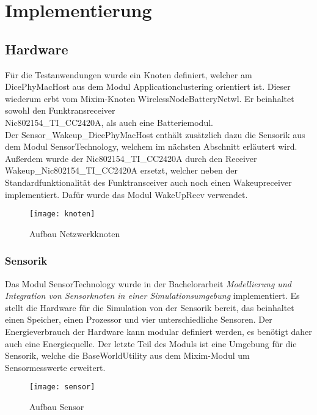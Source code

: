 \chapter{Implementierung}

\section{Hardware}

Für die Testanwendungen wurde ein Knoten definiert, welcher am DicePhyMacHost aus dem Modul Applicationclustering orientiert ist. Dieser wiederum erbt vom Mixim-Knoten WirelessNodeBatteryNetwl. Er beinhaltet sowohl den Funktransreceiver\\
 Nic802154\_TI\_CC2420A, als auch eine Batteriemodul. \\
 Der Sensor\_Wakeup\_DicePhyMacHost enthält zusätzlich dazu die Sensorik aus dem Modul SensorTechnology, welchem im nächsten Abschnitt erläutert wird. Außerdem wurde der Nic802154\_TI\_CC2420A durch den Receiver \\
 Wakeup\_Nic802154\_TI\_CC2420A ersetzt, welcher neben der Standardfunktionalität des Funktransceiver auch noch einen Wakeupreceiver implementiert. Dafür wurde das Modul WakeUpRecv verwendet.

\begin{figure}[htbp]
\centering
\caption{Aufbau Netzwerkknoten}
\label{fig:routingbsp}
\texttt{[image: knoten]}
\end{figure}

\subsection{Sensorik}

Das Modul SensorTechnology wurde in der Bachelorarbeit \textit{Modellierung und Integration von Sensorknoten in einer Simulationsumgebung} implementiert. Es stellt die Hardware für die Simulation von der Sensorik bereit, das beinhaltet einen Speicher, einen Prozessor und vier unterschiedliche Sensoren. Der Energieverbrauch der Hardware kann modular definiert werden, es benötigt daher auch eine Energiequelle. Der letzte Teil des Moduls ist eine Umgebung für die Sensorik, welche die BaseWorldUtility aus dem Mixim-Modul um Sensormesswerte erweitert.

\begin{figure}[htbp]
\centering
\caption{Aufbau Sensor}
\label{fig:routingbsp}
\texttt{[image: sensor]}
\end{figure}

